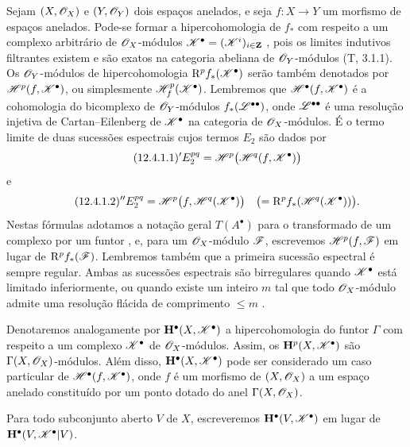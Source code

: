 \begin{env}[12.4.1]
\label{0.12.4.1}
Sejam $(X,\mathscr{O}_X)$ e $(Y,\mathscr{O}_Y)$ dois espaços anelados, e seja
$f:X\longrightarrow Y$ um morfismo de espaços anelados.
Pode-se formar a hipercohomologia de $f_*$ com respeito a um complexo
arbitrário de $\mathscr{O}_X$-módulos
$\mathscr{K}^\bullet=(\mathscr{K}^i)_{i\in\mathbf{Z}}$
, pois os limites indutivos filtrantes existem e são exatos
na categoria abeliana de $\mathscr{O}_Y$-módulos (T, 3.1.1).
Os $\mathscr{O}_Y$-módulos de hipercohomologia
$\mathrm{R}^p f_*(\mathscr{K}^\bullet)$ serão também denotados por
$\mathscr{H}^p(f,\mathscr{K}^\bullet)$, ou simplesmente
$\mathscr{H}^p_f(\mathscr{K}^\bullet)$.
Lembremos que $\mathscr{H}^\bullet(f,\mathscr{K}^\bullet)$ é a cohomologia do
bicomplexo de $\mathscr{O}_Y$-módulos $f_*(\mathscr{L}^{\bullet\bullet})$,
onde $\mathscr{L}^{\bullet\bullet}$ é uma resolução injetiva de
Cartan--Eilenberg de $\mathscr{K}^\bullet$ na categoria de
$\mathscr{O}_X$-módulos.
É o termo limite de duas sucessões espectrais cujos termos $E_2$
são dados por
\begin{equation}
\label{0.12.4.1.1}
\tag{12.4.1.1}
  {}'E_2^{pq}
  =\sh{H}^p\bigl(\sh{H}^q(f,\sh{K}^\bullet)\bigr)
\end{equation}
e
\begin{equation}
\label{0.12.4.1.2}
\tag{12.4.1.2}
  {}''E_2^{pq}
  =\sh{H}^p\bigl(f,\sh{H}^q(\sh{K}^\bullet)\bigr)
  \quad
  \bigl(=\RR^p f_*(\sh{H}^q(\sh{K}^\bullet))\bigr).
\end{equation}
Nestas fórmulas adotamos a notação geral $T(A^\bullet)$
para o transformado de um complexo por um funtor , e, para
um $\mathscr{O}_X$-módulo $\mathscr{F}$, escrevemos
$\mathscr{H}^p(f,\mathscr{F})$ em lugar de $\mathrm{R}^p f_*(\mathscr{F})$.
Lembremos também que a primeira sucessão espectral é sempre regular.
Ambas as sucessões espectrais são birregulares quando $\mathscr{K}^\bullet$ está
limitado inferiormente,
ou quando existe um inteiro $m$ tal que todo $\mathscr{O}_X$-módulo
admite uma resolução flácida de comprimento $\leq m$ .
\end{env}

\begin{env}[12.4.2]
\label{0.12.4.2}
Denotaremos analogamente por $\mathbf{H}^\bullet(X,\mathscr{K}^\bullet)$ a
hipercohomologia do funtor $\Gamma$ com respeito a um complexo
$\mathscr{K}^\bullet$ de $\mathscr{O}_X$-módulos.
Assim, os $\mathbf{H}^p(X,\mathscr{K}^\bullet)$ são
$\Gamma(X,\mathscr{O}_X)$-módulos.
Além disso, $\mathbf{H}^\bullet(X,\mathscr{K}^\bullet)$ pode ser considerado um
caso particular de $\mathscr{H}^\bullet(f,\mathscr{K}^\bullet)$, onde $f$ é um
morfismo de $(X,\mathscr{O}_X)$ a um espaço anelado constituído por um ponto
dotado do anel $\Gamma(X,\mathscr{O}_X)$.

Para todo subconjunto aberto $V$ de $X$, escreveremos
$\mathbf{H}^\bullet(V,\mathscr{K}^\bullet)$ em lugar de
$\mathbf{H}^\bullet(V,\mathscr{K}^\bullet|V)$.
\end{env}

